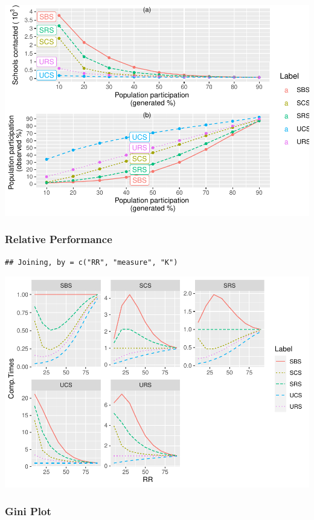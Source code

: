 \documentclass[
  english,
  man,floatsintext]{apa6}
\begin{document}
\includegraphics{5---Analysis_files/figure-latex/unnamed-chunk-34-1.pdf}

\hypertarget{relative-performance}{%
\subsubsection{Relative Performance}\label{relative-performance}}

\begin{verbatim}
## Joining, by = c("RR", "measure", "K")
\end{verbatim}

\includegraphics{5---Analysis_files/figure-latex/unnamed-chunk-35-1.pdf}

\hypertarget{gini-plot}{%
\subsubsection{Gini Plot}\label{gini-plot}}
\end{document}
